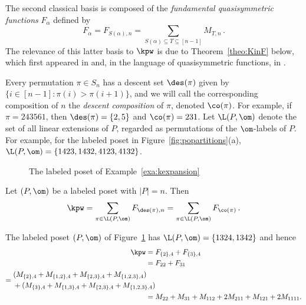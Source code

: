 The second classical basis is composed of the \emph{fundamental quasisymmetric functions} $F_\alpha$ defined by 
\begin{equation}\label{equ:F2M}
F_\alpha = F_{S(\alpha), n} = \sum_{S(\alpha) \subseteq T  \subseteq [n-1]} M_{T,n}\,.
\end{equation}
The relevance of this latter basis to $\kpw$ is due to Theorem~\ref{theo:KinF} below, which first appeared in \cite{StaThesis71,StaThesis} and, in the language of quasisymmetric functions, in \cite{Ges84}.  

Every permutation $\pi \in S_n$ has a descent set $\des(\pi)$ given by $\{i \in [n-1] : \pi(i) > \pi(i+1)\}$, and we will call the corresponding composition of $n$ the \emph{descent composition} of $\pi$, denoted $\co(\pi)$.  For example, if $\pi = 243561$, then $\des(\pi) = \{2,5\}$ and $\co(\pi) = 231$.  Let $\L(P,\om)$ denote the set of all linear extensions of $P$, regarded as permutations of the $\om$-labels of $P$.  For example, for the labeled poset in Figure~\ref{fig:popartitions}(a), $\L(P,\om) = \{1423, 1432, 4123, 4132\}$.  

\begin{figure}
\begin{center}
\caption{The labeled poset of Example~\ref{exa:kexpansion}}
\label{fig:labeled_poset}
\end{center}
\end{figure}

\begin{theorem}\label{theo:KinF}
Let $(P,\om)$ be a labeled poset with $|P|=n$.  Then
\[
\kpw = \sum_{\pi \in \L(P,\om)} F_{\des(\pi), n} = \sum_{\pi \in \L(P,\om)} F_{\co(\pi)}\,.
\]
\end{theorem}

\begin{example}\label{exa:kexpansion}
The labeled poset $(P,\om)$ of Figure~\ref{fig:labeled_poset} has $\L(P,\om) = \{1324, 1342\}$ and hence
\begin{align*}
\kpw ={}& F_{\{2\},4} + F_{\{3\},4} \\
={}&  F_{22} + F_{31} \\ 
= \begin{split}  {}&(M_{\{2\},4} + M_{\{1,2\},4} + M_{\{2,3\},4} + M_{\{1,2,3\},4}) \\{}& + (M_{\{3\},4} + M_{\{1,3\},4} + M_{\{2,3\},4} + M_{\{1,2,3\},4}) \end{split} \\
={}&  M_{22} + M_{31} + M_{112}  + 2M_{211} + M_{121} + 2M_{1111}.
\end{align*}
\end{example}

